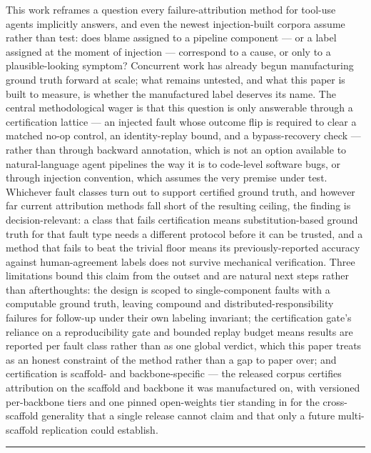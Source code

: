 \documentclass[11pt]{article}
\begin{document}
This work reframes a question every failure-attribution method for tool-use agents implicitly answers, and even the newest injection-built corpora assume rather than test: does blame assigned to a pipeline component --- or a label assigned at the moment of injection --- correspond to a cause, or only to a plausible-looking symptom? Concurrent work has already begun manufacturing ground truth forward at scale; what remains untested, and what this paper is built to measure, is whether the manufactured label deserves its name. The central methodological wager is that this question is only answerable through a certification lattice --- an injected fault whose outcome flip is required to clear a matched no-op control, an identity-replay bound, and a bypass-recovery check --- rather than through backward annotation, which is not an option available to natural-language agent pipelines the way it is to code-level software bugs, or through injection convention, which assumes the very premise under test. Whichever fault classes turn out to support certified ground truth, and however far current attribution methods fall short of the resulting ceiling, the finding is decision-relevant: a class that fails certification means substitution-based ground truth for that fault type needs a different protocol before it can be trusted, and a method that fails to beat the trivial floor means its previously-reported accuracy against human-agreement labels does not survive mechanical verification. Three limitations bound this claim from the outset and are natural next steps rather than afterthoughts: the design is scoped to single-component faults with a computable ground truth, leaving compound and distributed-responsibility failures for follow-up under their own labeling invariant; the certification gate's reliance on a reproducibility gate and bounded replay budget means results are reported per fault class rather than as one global verdict, which this paper treats as an honest constraint of the method rather than a gap to paper over; and certification is scaffold- and backbone-specific --- the released corpus certifies attribution on the scaffold and backbone it was manufactured on, with versioned per-backbone tiers and one pinned open-weights tier standing in for the cross-scaffold generality that a single release cannot claim and that only a future multi-scaffold replication could establish.

\vspace{1em}
\hrule
\vspace{1em}
\end{document}
